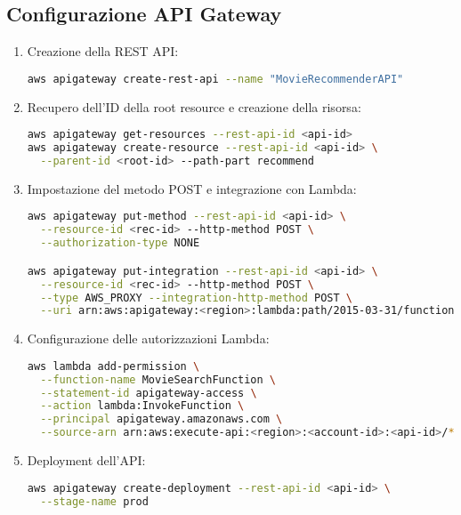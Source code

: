 \documentclass[11pt,a4paper]{article}
\begin{document}
\subsection{Configurazione API Gateway}
\begin{enumerate}
  \item Creazione della REST API:
\begin{lstlisting}[language=bash]
aws apigateway create-rest-api --name "MovieRecommenderAPI"
\end{lstlisting}

  \item Recupero dell'ID della root resource e creazione della risorsa:
\begin{lstlisting}[language=bash]
aws apigateway get-resources --rest-api-id <api-id>
aws apigateway create-resource --rest-api-id <api-id> \
  --parent-id <root-id> --path-part recommend
\end{lstlisting}

  \item Impostazione del metodo POST e integrazione con Lambda:
\begin{lstlisting}[language=bash]
aws apigateway put-method --rest-api-id <api-id> \
  --resource-id <rec-id> --http-method POST \
  --authorization-type NONE

aws apigateway put-integration --rest-api-id <api-id> \
  --resource-id <rec-id> --http-method POST \
  --type AWS_PROXY --integration-http-method POST \
  --uri arn:aws:apigateway:<region>:lambda:path/2015-03-31/functions/arn:aws:lambda:<region>:<account-id>:function:MovieSearchFunction/invocations
\end{lstlisting}

  \item Configurazione delle autorizzazioni Lambda:
\begin{lstlisting}[language=bash]
aws lambda add-permission \
  --function-name MovieSearchFunction \
  --statement-id apigateway-access \
  --action lambda:InvokeFunction \
  --principal apigateway.amazonaws.com \
  --source-arn arn:aws:execute-api:<region>:<account-id>:<api-id>/*/POST/recommend
\end{lstlisting}

  \item Deployment dell'API:
\begin{lstlisting}[language=bash]
aws apigateway create-deployment --rest-api-id <api-id> \
  --stage-name prod
\end{lstlisting}
\end{enumerate}
\end{document}
